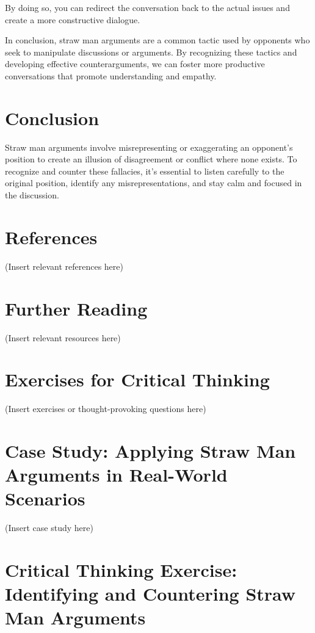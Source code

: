 By doing so, you can redirect the conversation back to the actual issues and create a more constructive dialogue.

In conclusion, straw man arguments are a common tactic used by opponents who seek to manipulate discussions or arguments. By recognizing these tactics and developing effective counterarguments, we can foster more productive conversations that promote understanding and empathy.

\section*{Conclusion}

Straw man arguments involve misrepresenting or exaggerating an opponent's position to create an illusion of disagreement or conflict where none exists. To recognize and counter these fallacies, it's essential to listen carefully to the original position, identify any misrepresentations, and stay calm and focused in the discussion.

\section*{References}

(Insert relevant references here)

\section*{Further Reading}

(Insert relevant resources here)

\section*{Exercises for Critical Thinking}

(Insert exercises or thought-provoking questions here)

\section*{Case Study: Applying Straw Man Arguments in Real-World Scenarios}

(Insert case study here)

\section*{Critical Thinking Exercise: Identifying and Countering Straw Man Arguments}
